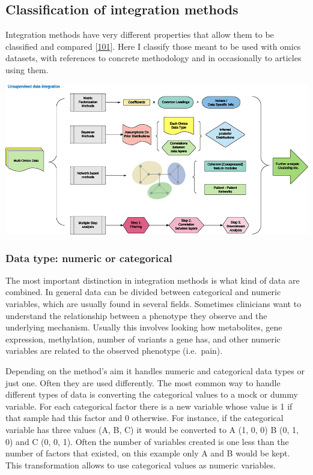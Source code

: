 \documentclass[
  12pt,
  a4paper,
  twoside,
  openright]{book}
\let\origfigure\figure
\let\endorigfigure\endfigure
\renewenvironment{figure}[1][2] {
    \expandafter\origfigure\expandafter[!htp]
} {
    \endorigfigure
}
\begin{document}
\hypertarget{classification-of-integration-methods}{%
\subsection{Classification of integration methods}\label{classification-of-integration-methods}}

Integration methods have very different properties that allow them to be classified and compared {[}\protect\hyperlink{ref-huang2017}{101}{]}.
Here I classify those meant to be used with omics datasets, with references to concrete methodology and in occasionally to articles using them.

\begin{figure}
\includegraphics[width=1\linewidth]{images/figure1_huang2017} \caption[Unsupervised data integration methodology.]{Unsupervised data integration methodology. Figure 1 from Huang 2017.}\label{fig:classification}
\end{figure}

\hypertarget{data-type-numeric-or-categorical}{%
\subsubsection{Data type: numeric or categorical}\label{data-type-numeric-or-categorical}}

The most important distinction in integration methods is what kind of data are combined.
In general data can be divided between categorical and numeric variables, which are usually found in several fields.
Sometimes clinicians want to understand the relationship between a phenotype they observe and the underlying mechanism.
Usually this involves looking how metabolites, gene expression, methylation, number of variants a gene has, and other numeric variables are related to the observed phenotype (i.e.~pain).

Depending on the method's aim it handles numeric and categorical data types or just one.
Often they are used differently.
The most common way to handle different types of data is converting the categorical values to a mock or dummy variable.
For each categorical factor there is a new variable whose value is 1 if that sample had this factor and 0 otherwise.
For instance, if the categorical variable has three values (A, B, C) it would be converted to A (1, 0, 0) B (0, 1, 0) and C (0, 0, 1).
Often the number of variables created is one less than the number of factors that existed, on this example only A and B would be kept.
This transformation allows to use categorical values as numeric variables.
\end{document}
